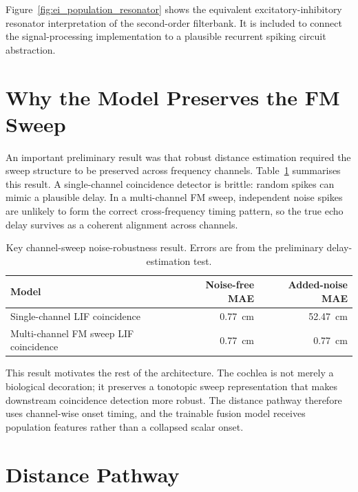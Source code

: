 

Figure~\ref{fig:ei_population_resonator} shows the equivalent excitatory-inhibitory resonator interpretation of the second-order filterbank. It is included to connect the signal-processing implementation to a plausible recurrent spiking circuit abstraction.

\section{Why the Model Preserves the FM Sweep}

An important preliminary result was that robust distance estimation required the sweep structure to be preserved across frequency channels. Table~\ref{tab:sweep_noise_key_result} summarises this result. A single-channel coincidence detector is brittle: random spikes can mimic a plausible delay. In a multi-channel FM sweep, independent noise spikes are unlikely to form the correct cross-frequency timing pattern, so the true echo delay survives as a coherent alignment across channels.

\begin{table}[h]
    \centering
    \caption{Key channel-sweep noise-robustness result. Errors are from the preliminary delay-estimation test.}
    \label{tab:sweep_noise_key_result}
    \begin{tabular}{lrr}
        \toprule
        Model & Noise-free MAE & Added-noise MAE \\
        \midrule
        Single-channel LIF coincidence & 0.77~cm & 52.47~cm \\
        Multi-channel FM sweep LIF coincidence & 0.77~cm & 0.77~cm \\
        \bottomrule
    \end{tabular}
\end{table}

This result motivates the rest of the architecture. The cochlea is not merely a biological decoration; it preserves a tonotopic sweep representation that makes downstream coincidence detection more robust. The distance pathway therefore uses channel-wise onset timing, and the trainable fusion model receives population features rather than a collapsed scalar onset.

\section{Distance Pathway}

